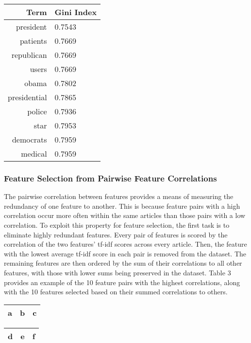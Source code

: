 \documentclass[11pt]{article}
\begin{document}
\begin{center}
\begin{tabular}{ |r|l| } 
 \hline
 Term & Gini Index \\
 \hline
president &     0.7543 \\
patients &      0.7669 \\
republican &    0.7669 \\
users &         0.7669 \\
obama &         0.7802 \\
presidential &  0.7865 \\
police &        0.7936 \\
star &          0.7953 \\
democrats &     0.7959 \\
medical &       0.7959 \\
 \hline
\end{tabular}
\end{center}


\subsubsection{Feature Selection from Pairwise Feature Correlations}

The pairwise correlation between features provides a means of measuring the redundancy of one feature to another.
This is because feature pairs with a high correlation occur more often within the same articles than those pairs with a low correlation.
To exploit this property for feature selection, the first task is to eliminate highly redundant features.
Every pair of features is scored by the correlation of the two features' tf-idf scores across every article.
Then, the feature with the lowest average tf-idf score in each pair is removed from the dataset.
The remaining features are then ordered by the sum of their correlations to all other features, with those with lower sums being preserved in the dataset.
Table 3 provides an example of the 10 feature pairs with the highest correlations, along with the 10 features selected based on their summed correlations to others.

\begin{center}
\begin{tabular}{ccc}
\hline
a&b&c\\
\hline
\end{tabular}
\quad
\begin{tabular}{ccc}
\hline
d&e&f\\
\hline
\end{tabular}
\end{center}
\end{document}
